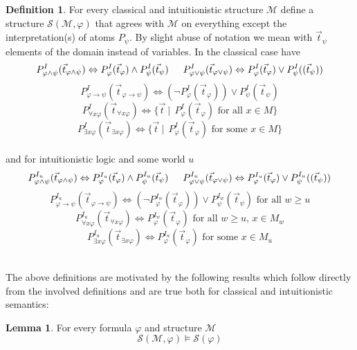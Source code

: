 \documentclass[a4paper,12pt]{report}
\theoremstyle{definition}
\theoremstyle{definition}
\theoremstyle{definition}
\newtheorem{lemma}[theorem]{Lemma}
\theoremstyle{definition}
\theoremstyle{definition}
\newtheorem{definition}[theorem]{Definition}
\theoremstyle{definition}
\theoremstyle{definition}
\begin{document}
	\begin{definition}
		For every classical and intuitionistic structure $\mathcal M$ define a structure $\mathcal S(\mathcal M,\varphi)$ that agrees with $\mathcal M$ on everything except the interpretation(s) of atoms $P_\psi$. By slight abuse of notation we mean with $\vec t_\psi$ elements of the domain instead of variables. In the classical case have	
		$$P_{\varphi\wedge\psi}^I(\vec t_{\varphi\wedge\psi}) \Leftrightarrow P_{\varphi}^I(\vec t_\varphi)\wedge P_{\psi}^I(\vec t_\psi)\indent P_{\varphi\vee\psi}^I(\vec t_{\varphi\vee\psi}) \Leftrightarrow P_{\varphi}^I(\vec t_\varphi)\vee P_{\psi}^I((\vec t_\psi))$$$$ P_{\varphi\to\psi}^I(\vec t_{\varphi\to\psi}) \Leftrightarrow (\neg P_{\varphi}^I(\vec t_{\varphi}))\vee P_{\psi}^I(\vec t_{\psi})$$
		$$P_{\forall x\varphi}^I(\vec t_{\forall x\varphi}) \Leftrightarrow \{\vec t\:|\:\:P_{\varphi}^I(\vec t_\varphi) \text{ for all $x\in M$}\}$$$$ P_{\exists x\varphi}^I(\vec t_{\exists x\varphi}) \Leftrightarrow \{\vec t\:|\:\:P_{\varphi}^I(\vec t_\varphi) \text{ for some $x\in M$}\}$$
		\\
		
		and for intuitionistic logic and some world $u$ 		
		$$P_{\varphi\wedge\psi}^{I_u}(\vec t_{\varphi\wedge\psi}) \Leftrightarrow P_{\varphi}^{I_u}(\vec t_\varphi)\wedge P_{\psi}^{I_u}(\vec t_\psi)\indent P_{\varphi\vee\psi}^{I_u}(\vec t_{\varphi\vee\psi}) \Leftrightarrow P_{\varphi}^{I_u}(\vec t_\varphi)\vee P_{\psi}^{I_u}((\vec t_\psi))$$$$ P_{\varphi\to\psi}^{I_u}(\vec t_{\varphi\to\psi}) \Leftrightarrow(\neg P_{\varphi}^{I_w}(\vec t_{\varphi}))\vee P_{\psi}^{I_w}(\vec t_{\psi})\text{ for all $w\geq u$}$$
		$$P_{\forall x\varphi}^{I_u}(\vec t_{\forall x\varphi}) \Leftrightarrow P_{\varphi}^{I_w}(\vec t_\varphi) \text{ for all $w\geq u$, $x\in M_w$}$$$$ P_{\exists x\varphi}^{I_u}(\vec t_{\exists x\varphi}) \Leftrightarrow P_{\varphi}^{I_u}(\vec t_\varphi) \text{ for some $x\in M_u$}$$
		\\
	\end{definition}

	The above definitions are motivated by the following results which follow directly from the involved definitions and are true both for classical and intuitionistic semantics:
	
	\begin{lemma}
		For every formula $\varphi$ and structure $\mathcal M$
		$$\mathcal S(\mathcal M, \varphi)\models\mathcal S(\varphi)$$
	\end{lemma}
\end{document}
